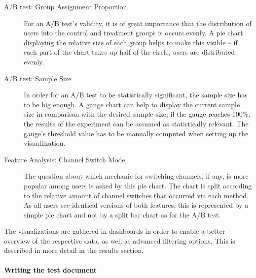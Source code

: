 \begin{description}
\item[A/B test: Group Assignment Proportion]
For an A/B test's validity, it is of great importance that the distribution of users into the control and treatment groups is occurs evenly.
A pie chart displaying the relative size of each group helps to make this visible -- if each part of the chart takes up half of the circle, users are distributed evenly.

\item[A/B test: Sample Size]
In order for an A/B test to be statistically significant, the sample size has to be big enough.
A gauge chart can help to display the current sample size in comparison with the desired sample size; if the gauge reaches 100\%, the results of the experiment can be assumed as statistically relevant.
The gauge's threshold value has to be manually computed when setting up the visualilzation.

\item[Feature Analysis: Channel Switch Mode] 
The question about which mechanic for switching channels, if any, is more popular among users is asked by this pie chart.
The chart is split according to the relative amount of channel switches that occurred via each method.
As all users see identical versions of both features, this is represented by a simple pie chart and not by a split bar chart as for the A/B test.

\end{description}

The visualizations are gathered in dashboards in order to enable a better overview of the respective data, as well as advanced filtering options.
This is described in more detail in the results section.




\paragraph{Writing the test document}

